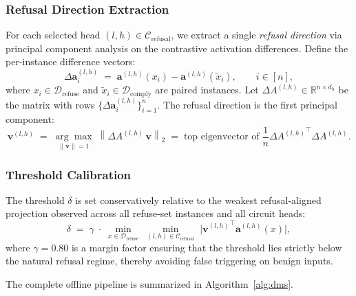 \documentclass[11pt]{article}
\begin{document}
\subsubsection{Refusal Direction Extraction}
\label{subsubsec:direction}

For each selected head $(l,h)\in\mathcal{C}_{\mathrm{refusal}}$, we extract a single \emph{refusal direction} via principal component analysis on the contrastive activation differences. Define the per-instance difference vectors:
\begin{equation}
\label{eq:diff}
\Delta\mathbf{a}_i^{(l,h)} \;=\; \mathbf{a}^{(l,h)}(x_i) - \mathbf{a}^{(l,h)}(\tilde{x}_i), \qquad i\in[n],
\end{equation}
where $x_i\in\mathcal{D}_{\mathrm{refuse}}$ and $\tilde{x}_i\in\mathcal{D}_{\mathrm{comply}}$ are paired instances. Let $\Delta A^{(l,h)}\in\mathbb{R}^{n\times d_h}$ be the matrix with rows $\{\Delta\mathbf{a}_i^{(l,h)}\}_{i=1}^n$. The refusal direction is the first principal component:
\begin{equation}
\label{eq:refusal_dir}
\mathbf{v}^{(l,h)} \;=\; \underset{\|\mathbf{v}\|=1}{\arg\max}\;\left\|\Delta A^{(l,h)}\,\mathbf{v}\right\|_2 \;=\; \text{top eigenvector of}\;\frac{1}{n}{\Delta A^{(l,h)}}^\top\!\Delta A^{(l,h)}.
\end{equation}

\subsubsection{Threshold Calibration}
\label{subsubsec:threshold}

The threshold $\delta$ is set conservatively relative to the weakest refusal-aligned projection observed across all refuse-set instances and all circuit heads:
\begin{equation}
\label{eq:threshold}
\delta \;=\; \gamma\;\cdot\;\min_{x\in\mathcal{D}_{\mathrm{refuse}}}\;\min_{(l,h)\in\mathcal{C}_{\mathrm{refusal}}}\;\big|{\mathbf{v}^{(l,h)}}^\top\!\mathbf{a}^{(l,h)}(x)\big|,
\end{equation}
where $\gamma{=}0.80$ is a margin factor ensuring that the threshold lies strictly below the natural refusal regime, thereby avoiding false triggering on benign inputs.

The complete offline pipeline is summarized in Algorithm~\ref{alg:dms}.
\end{document}
